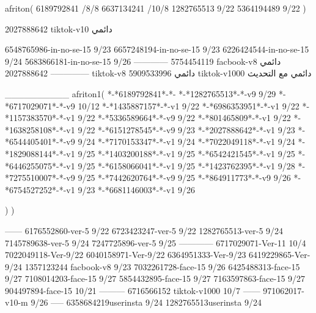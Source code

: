 afriton(
6189792841 /8/8
6637134241 /10/8
1282765513 9/22
5364194489 9/22
)

2027888642 tiktok-v10
دائمي



6548765986-in-no-se-15 9/23
6657248194-in-no-se-15 9/23
6226424544-in-no-se-15 9/24
5683866181-in-no-se-15 9/26
------------
5754454119 facbook-v8
دائمي
--------------
2027888642 tiktok-v8
دائمي
5909533996 tiktok-v1000
دائمي مع التحديث

__________
afriton1(
*-*6189792841*-*-
*-*1282765513*-*-v9 9/29
*-*6717029071*-*-v9 10/12
*-*1435887157*-*-v1 9/22
*-*6986353951*-*-v1 9/22
*-*1157383570*-*-v1 9/22
*-*5336589664*-*-v9 9/22
*-*801465809*-*-v1 9/22
*-*1638258108*-*-v1 9/22
*-*6151278545*-*-v9 9/23
*-*2027888642*-*-v1 9/23
*-*6544405401*-*-v9 9/24
*-*7170153347*-*-v1 9/24
*-*7022049118*-*-v1 9/24
*-*1829088144*-*-v1 9/25
*-*1403200188*-*-v1 9/25
*-*6542421545*-*-v1 9/25
*-*6446255075*-*-v1 9/25
*-*6158066041*-*-v1 9/25
*-*1423762395*-*-v1 9/28
*-*7275510007*-*-v9 9/25
*-*7442620764*-*-v9 9/25
*-*864911773*-*-v9 9/26
*-*6754527252*-*-v1 9/23
*-*6681146003*-*-v1 9/26

)
)

------
6176552860-ver-5 9/22
6723423247-ver-5 9/22
1282765513-ver-5 9/24
7145789638-ver-5 9/24
7247725896-ver-5 9/25
------------
6717029071-Ver-11
10/4
7022049118-Ver-9/22
6040158971-Ver-9/22
6364951333-Ver-9/23
6419229865-Ver-9/24
1357123244 facbook-v8 9/23
7032261728-face-15 9/26
6425488313-face-15 9/27
7108014203-face-15 9/27
5854432895-face-15 9/27
7163597863-face-15 9/27
904497894-face-15 10/21
---------
6716566152 tiktok-v1000
10/7
------
971062017-v10-m 9/26
-----
6358684219userinsta 9/24
1282765513userinsta 9/24
